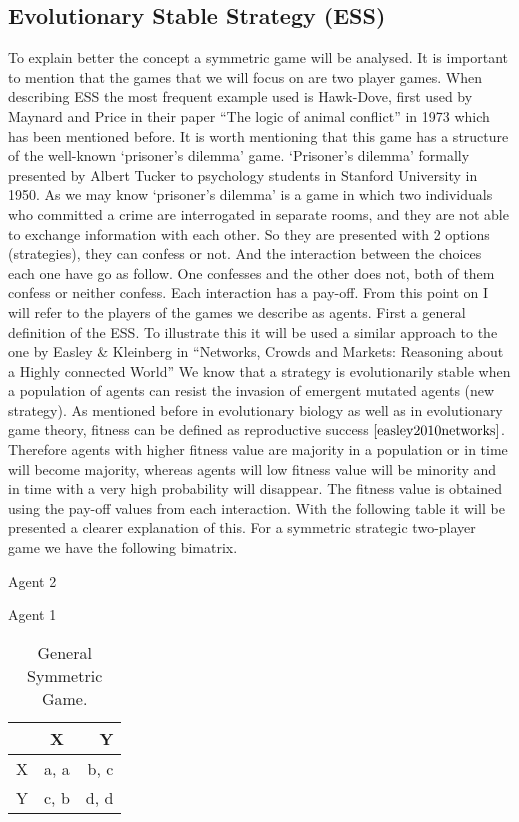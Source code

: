 \documentclass{book}
\begin{document}
\subsection{Evolutionary Stable Strategy (ESS)}\label{EES}
To explain better the concept a symmetric game will be analysed. It is important to mention that the games that we will focus on are two player games. 
When describing ESS the most frequent example used is Hawk-Dove, first used by Maynard and Price in their paper ``The logic of animal conflict'' in 1973 which has been mentioned before. It is worth mentioning that this game has a structure of the well-known ‘prisoner’s dilemma’ game. `Prisoner’s dilemma’ formally presented by Albert Tucker to psychology students in Stanford University in 1950. As we may know ‘prisoner’s dilemma’ is a game in which two individuals who committed a crime are interrogated in separate rooms, and they are not able to exchange information with each other. So they are presented with 2 options (strategies), they can confess or not. And the interaction between the choices each one have go as follow. One confesses and the other does not, both of them confess or neither confess. Each interaction has a pay-off. From this point on I will refer to the players of the games we describe as agents.
First a general definition of the ESS. To illustrate this it will be used a similar approach to the one by Easley \& Kleinberg in ``Networks, Crowds and Markets: Reasoning about a Highly connected World''
We know that a strategy is evolutionarily stable when a population of agents can resist the invasion of emergent mutated agents (new strategy). As mentioned before in evolutionary biology as well as in evolutionary game theory, fitness can be defined as reproductive success $\cite{easley2010networks}$. Therefore agents with higher fitness value are majority in a population or in time will become majority, whereas agents will low fitness value will be minority and in time with a very high probability will disappear. The fitness value is obtained using the pay-off values from each interaction. With the following table it will be presented a clearer explanation of this.
For a symmetric strategic two-player game we have the following bimatrix.

\begin{table}[h]
\begin{center}
Agent 2

Agent 1
\begin{tabular}{|l|c|r|}
\hline
 & X & Y\\ 
\hline
X & a, a & b, c\\
\hline
Y & c, b & d, d\\
\hline
\end{tabular}
\end{center}
\caption{ General Symmetric Game.}
\label{tab:gensymgame}
\end{table}
\end{document}
